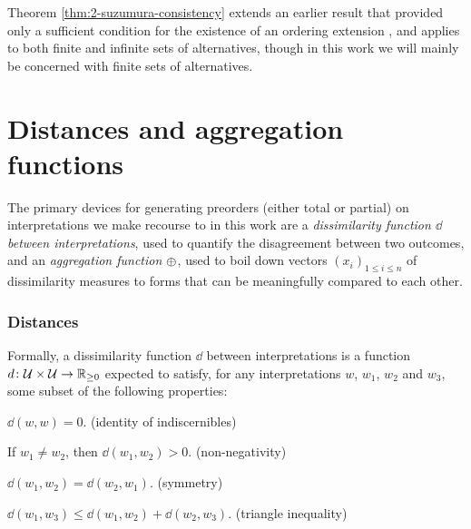 Theorem \ref{thm:2-suzumura-consistency} extends an earlier result 
that provided only a sufficient condition for the existence 
of an ordering extension
\cite{Szpilrajn30}, 
and applies to both finite and infinite sets of alternatives,
though in this work we will mainly be concerned 
with finite sets of alternatives.


























\section{Distances and aggregation functions}\label{sec:2-distances}
The primary devices for generating preorders (either total or partial) on interpretations 
we make recourse to in this work are a \emph{dissimilarity function $\dd$ between interpretations},
used to quantify the disagreement between two outcomes,
and an \emph{aggregation function ${\operatorname{\oplus}}$},
used to boil down vectors $(x_i)_{1\le i\le n}$ of dissimilarity measures to forms
that can be meaningfully compared to each other.

\subsubsection{Distances}
Formally, a dissimilarity function $\dd$ between interpretations is 
a function $d\colon\mathcal{U}\times\mathcal{U}\rightarrow\mathbb{R}_{\geq 0}$
expected to satisfy, for any interpretations $w$, $w_1$, $w_2$ and $w_3$,
some subset of the following properties:

\begin{description}[leftmargin=3em]
	\item[($\ood{1}$)] $\dd(w,w)=0$. \hfill(identity of indiscernibles)
	\item[($\ood{2}$)] If $w_1\neq w_2$, then $\dd(w_1,w_2)>0$. \hfill(non-negativity)
	\item[($\ood{3}$)] $\dd(w_1,w_2) = \dd(w_2,w_1)$. \hfill(symmetry)
	\item[($\ood{4}$)] $\dd(w_1,w_3) \leq \dd(w_1,w_2) + \dd(w_2,w_3)$. \hfill(triangle inequality)
\end{description}

